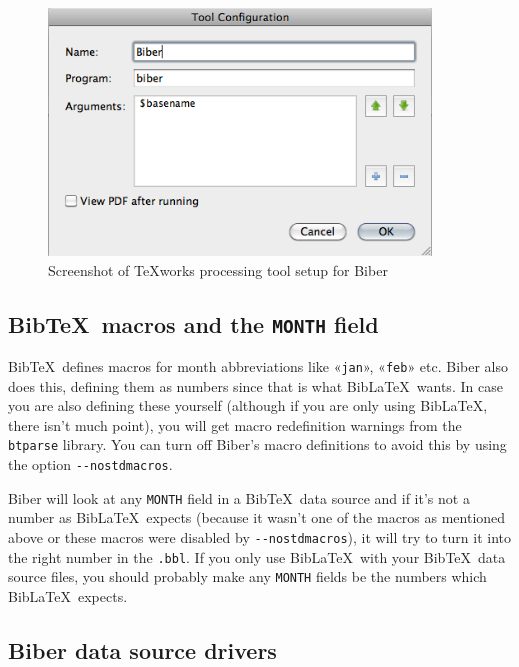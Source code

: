 \documentclass{ltxdockit}
\begin{document}
\begin{figure}[!htpb]
  \centering
  \includegraphics[width=4in,keepaspectratio=true]{biber-texworks.png}
  \caption{Screenshot of \TeX works processing tool setup for Biber}
  \label{fig:biber-texworks}
\end{figure}

\subsection{Bib\TeX\ macros and the \texttt{MONTH} field}

Bib\TeX\ defines macros for month abbreviations
like «\verb+jan+», «\verb+feb+» etc. Biber also does this,
defining them as numbers since that is what Bib\LaTeX\ wants. In
case you are also defining these yourself (although if you are only
using Bib\LaTeX, there isn't much point), you will get macro
redefinition warnings from the \verb+btparse+ library. You can turn
off Biber's macro definitions to avoid this by using the option
\verb+--nostdmacros+.

Biber will look at any \verb+MONTH+ field in a Bib\TeX\ data
source and if it's not a number as Bib\LaTeX\ expects (because it
wasn't one of the macros as mentioned above or these macros were disabled
by \verb+--nostdmacros+), it will try to turn it into the right number in
the \verb+.bbl+. If you only use Bib\LaTeX\ with your Bib\TeX\
data source files, you should probably make any \verb+MONTH+ fields be the
numbers which Bib\LaTeX\ expects.

\subsection{Biber data source drivers}\label{dcf}
\end{document}
